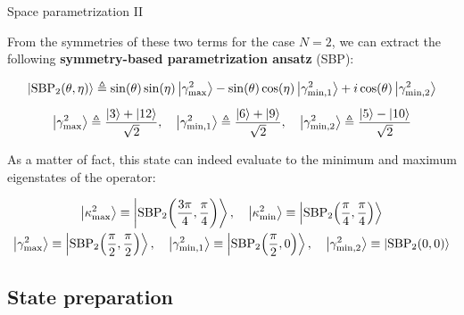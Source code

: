 \documentclass[9pt, aspectratio=169]{beamer}
\begin{document}
\begin{frame}{Space parametrization II}

	From the symmetries of these two terms for the case $N=2$, we can extract the following \textbf{symmetry-based parametrization ansatz} (SBP):

	\begin{gather*}
	  \ket{\text{SBP}_{2} \qty(\theta, \eta)} \defeq
	    \sin(\theta)\sin(\eta) \ket{\gamma_{\text{max}}^2} -
	    \sin(\theta)\cos(\eta) \ket{\gamma_{\text{min},1}^2} + i
	    \cos(\theta) \ket{\gamma_{\text{min},2}^2} \\[5pt]
	  \ket{\gamma_{\text{max}}^2} \defeq
	    \frac{\ket{3}+\ket{12}}{\sqrt{2}} \qc
	  \ket{\gamma_{\text{min},1}^2} \defeq
	    \frac{\ket{6}+\ket{9}}{\sqrt{2}} \qc
	  \ket{\gamma_{\text{min},2}^2} \defeq
	    \frac{\ket{5} - \ket{10}}{\sqrt{2}}
	\end{gather*}

	\vspace{1em} \pause

	As a matter of fact, this state can indeed evaluate to the minimum and maximum eigenstates of the operator:

	\begin{gather*}
	  \ket{\kappa_{\text{max}}^{2}} \equiv
	    \ket{\text{SBP}_{2} \qty(\frac{3\pi}{4}, \frac{\pi}{4})} \qc
	  \ket{\kappa_{\text{min}}^{2}} \equiv
	    \ket{\text{SBP}_{2} \qty(\frac{\pi}{4}, \frac{\pi}{4})} \\
	  \ket{\gamma_{\text{max}}^{2}} \equiv
	    \ket{\text{SBP}_{2} \qty(\frac{\pi}{2}, \frac{\pi}{2})} \qc
	  \ket{\gamma_{\text{min},1}^{2}} \equiv
	    \ket{\text{SBP}_{2} \qty(\frac{\pi}{2}, 0)} \qc
	  \ket{\gamma_{\text{min},2}^{2}} \equiv
	    \ket{\text{SBP}_{2} \qty(0, 0)}
	\end{gather*}

\end{frame}


\subsection{State preparation}
\end{document}
